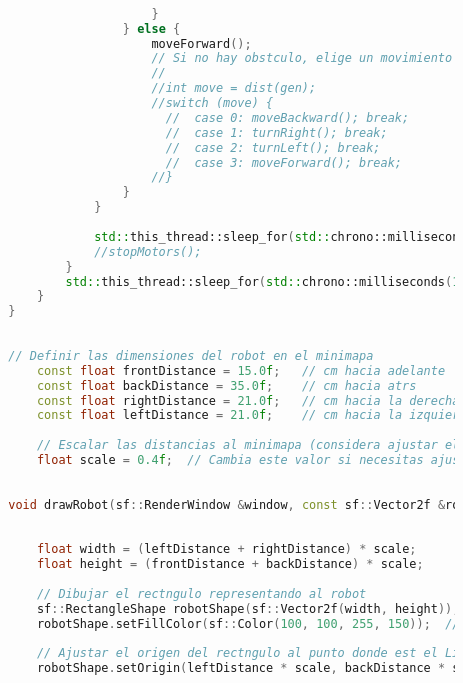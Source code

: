\begin{lstlisting}[language={C++}, caption={Primer ajuste de c\'odigo}, label={Script}]
                                
                                
                            }
                        } else {
                            moveForward();
                            // Si no hay obstculo, elige un movimiento aleatorio
                            //
                            //int move = dist(gen);
                            //switch (move) {
                              //  case 0: moveBackward(); break;
                              //  case 1: turnRight(); break;
                              //  case 2: turnLeft(); break;
                              //  case 3: moveForward(); break;
                            //}
                        }
                    }
                    
                    std::this_thread::sleep_for(std::chrono::milliseconds(500));
                    //stopMotors();
                }
                std::this_thread::sleep_for(std::chrono::milliseconds(100));
            }
        }
        
        
        // Definir las dimensiones del robot en el minimapa
            const float frontDistance = 15.0f;   // cm hacia adelante
            const float backDistance = 35.0f;    // cm hacia atrs
            const float rightDistance = 21.0f;   // cm hacia la derecha
            const float leftDistance = 21.0f;    // cm hacia la izquierda
        
            // Escalar las distancias al minimapa (considera ajustar el factor de escala segn lo necesites)
            float scale = 0.4f;  // Cambia este valor si necesitas ajustar el tamao del robot en el minimapa
        
        
        void drawRobot(sf::RenderWindow &window, const sf::Vector2f &robotPosition, const sf::RectangleShape &minimap) {
            
        
            float width = (leftDistance + rightDistance) * scale;
            float height = (frontDistance + backDistance) * scale;
        
            // Dibujar el rectngulo representando al robot
            sf::RectangleShape robotShape(sf::Vector2f(width, height));
            robotShape.setFillColor(sf::Color(100, 100, 255, 150));  // Color azul claro con algo de transparencia
        
            // Ajustar el origen del rectngulo al punto donde est el LiDAR, es decir, al centro del robot
            robotShape.setOrigin(leftDistance * scale, backDistance * scale);
        

\end{lstlisting}
